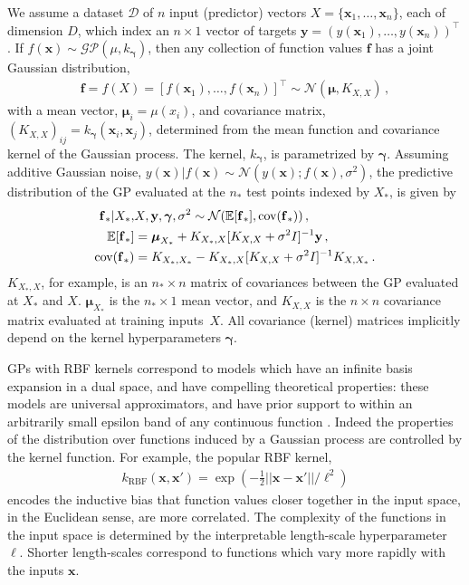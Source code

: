 \documentclass[twoside,11pt]{article}
\newcommand{\mbf}[1]{{\boldsymbol{\mathbf{#1}}}}
\renewcommand{\bm}{\mbf}
\begin{document}
We assume a dataset $\mathcal{D}$ of $n$ input (predictor) vectors
$X = \{\bm{x}_1,\dots,\bm{x}_n\}$, each of dimension $D$,
which index an $n \times 1$ vector of targets
$\bm{y} = (y(\bm{x}_1),\dots,y(\bm{x}_n))^{\top}$.  If
$f(\bm{x}) \sim \mathcal{GP}(\mu,k_{\bm{\gamma}})$, then any
collection of function values $\bm{f}$ has a joint Gaussian
distribution,
\begin{align}
 \bm{f} = f(X) = [f(\bm{x}_1),\dots,f(\bm{x}_n)]^{\top} \sim \mathcal{N}(\bm{\mu},K_{X,X}) \,,  \label{eqn: gpdef}
\end{align}
with a mean vector, $\bm{\mu}_i = \mu(x_i)$, and covariance matrix, $(K_{X,X})_{ij} = k_\bm{\gamma}(\bm{x}_i,\bm{x}_j)$, 
determined from the mean function and covariance kernel of the Gaussian process.
The kernel, $k_{\bm{\gamma}}$, is parametrized by $\bm{\gamma}$.  Assuming additive
Gaussian noise, $y(\bm{x})|f(\bm{x}) \sim \mathcal{N}(y(\bm{x}); f(\bm{x}),\sigma^2)$,
the predictive distribution of the GP evaluated at the
$n_*$ test points indexed by $X_*$, is given by
\begin{align}
 \bm{f}_*|X_*,&X,\bm{y},\bm{\gamma},\sigma^2 \sim \mathcal{N}(\mathbb{E}[\bm{f}_*],\text{cov}(\bm{f}_*)) \,, \label{eqn: fullpred}  \\
 \mathbb{E}[\bm{f}_*] &= \bm{\mu}_{X_*}  + K_{X_*,X}[K_{X,X}+\sigma^2 I]^{-1}\bm{y}\,,   \notag \\
 \text{cov}(\bm{f}_*) &= K_{X_*,X_*} - K_{X_*,X}[K_{X,X}+\sigma^2 I]^{-1}K_{X,X_*} \,.  \notag
\end{align}
$K_{X_*,X}$, for example, is an $n_* \times n$ matrix of covariances between
the GP evaluated at $X_*$ and $X$.   $\bm{\mu}_{X_*}$ is the $n_* \times 1$ mean vector,
and $K_{X,X}$ is the $n \times n$ covariance
matrix evaluated at training inputs~$X$.  All covariance (kernel) matrices implicitly depend on the kernel 
hyperparameters $\bm{\gamma}$.

GPs with RBF kernels correspond to models which have an infinite basis expansion in a dual space, and have
compelling theoretical properties: these models are universal approximators, and have prior support to within an arbitrarily small epsilon band of
any continuous function \citep{micchelli2006universal}.
Indeed the properties of the distribution over functions induced by a Gaussian process are controlled by the kernel function.
For example, the popular RBF kernel,
\begin{align}
k_{\text{RBF}}(\bm{x},\bm{x}') = \exp (-\frac{1}{2} ||\bm{x}-\bm{x}' || / \ell^2)  \label{eqn: rbfkernel}
\end{align}
encodes the inductive bias that function values closer together in the input space, in the Euclidean sense, are more correlated.   The complexity of the functions in the
input space is determined by the interpretable length-scale hyperparameter $\ell$.  Shorter length-scales correspond to functions which vary more rapidly
with the inputs $\bm{x}$.
\end{document}
